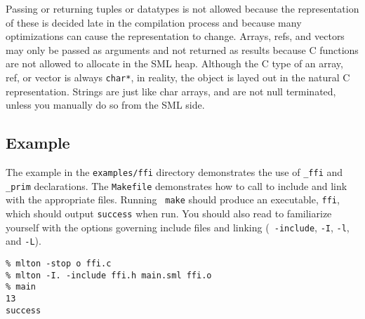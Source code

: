 Passing or returning tuples or datatypes is not allowed because the
representation of these is decided late in the compilation
process and because many optimizations can cause the representation to
change.  Arrays, refs, and vectors may only be passed as arguments and
not returned as results because C functions are not allowed to
allocate in the SML heap.  Although the C type of an array, ref, or
vector is always {\tt char*}, in reality, the object is layed out in
the natural C representation.
Strings are just
like char arrays, and are not null terminated, unless you manually do
so from the SML side.



\subsection{Example}

The example in the {\tt examples/ffi} directory demonstrates the use of
\verb+_ffi+ and \verb+_prim+ declarations.  The {\tt Makefile} demonstrates how
to call {\mlton} to include and link with the appropriate files.  Running {\tt
make} should produce an executable, {\tt ffi}, which should output {\tt success}
when run.  You should also read  to familiarize
yourself with the {\mlton} options governing include files and linking ({\tt
-include}, {\tt -I}, {\tt -l}, and {\tt -L}).

\begin{verbatim}
% mlton -stop o ffi.c
% mlton -I. -include ffi.h main.sml ffi.o
% main
13
success
\end{verbatim}
